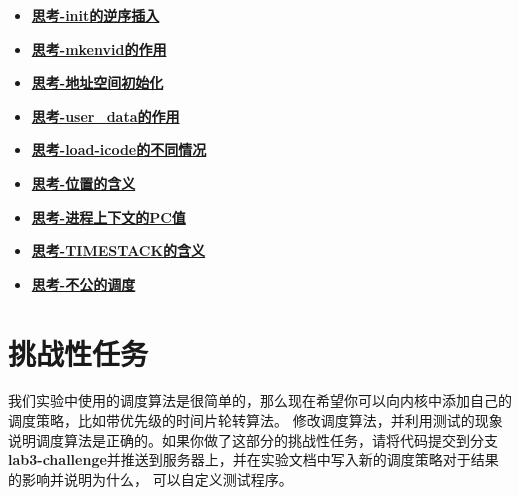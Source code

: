 \begin{itemize}
\item \hyperref[think-env_init]{\textbf{\textcolor{baseB}{思考-init的逆序插入}}}
\item \hyperref[think-mkenvid]{\textbf{\textcolor{baseB}{思考-mkenvid的作用}}}
\item \hyperref[think-env_setup_vm]{\textbf{\textcolor{baseB}{思考-地址空间初始化}}}
\item \hyperref[think-user-data]{\textbf{\textcolor{baseB}{思考-user\_data的作用}}}
\item \hyperref[think-load-icode]{\textbf{\textcolor{baseB}{思考-load-icode的不同情况}}}
\item \hyperref[think-位置]{\textbf{\textcolor{baseB}{思考-位置的含义}}}
\item \hyperref[think-pc]{\textbf{\textcolor{baseB}{思考-进程上下文的PC值}}}
\item \hyperref[think-TIMESTACK]{\textbf{\textcolor{baseB}{思考-TIMESTACK的含义}}}
\item \hyperref[think-调度]{\textbf{\textcolor{baseB}{思考-不公的调度}}}
\end{itemize}

\section{挑战性任务}
我们实验中使用的调度算法是很简单的，那么现在希望你可以向内核中添加自己的调度策略，比如带优先级的时间片轮转算法。
修改调度算法，并利用测试的现象说明调度算法是正确的。如果你做了这部分的挑战性任务，请将代码提交到分支
\textbf{lab3-challenge}并推送到服务器上，并在实验文档中写入新的调度策略对于结果的影响并说明为什么，
可以自定义测试程序。

